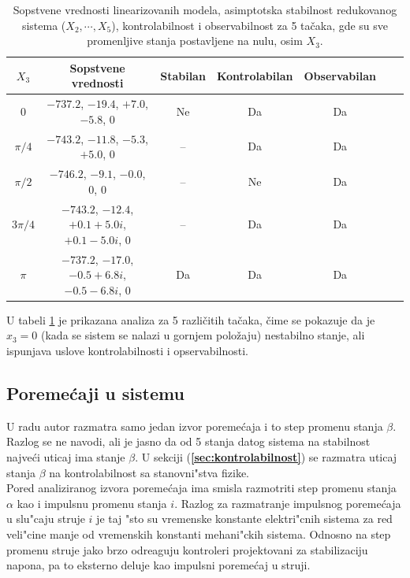 \documentclass[a4paper,11pt]{article}
\theoremstyle{definition} \newtheorem{deff}{Definicija}[section]
\theoremstyle{definition} \newtheorem{prim}[deff]{Primer}
\theoremstyle{plain} \newtheorem{teor}[deff]{Teorema}
\begin{document}
	
	
	\begin{table}[H]
		\centering
		\caption{Sopstvene vrednosti linearizovanih modela, asimptotska stabilnost redukovanog sistema ($X_2, \cdots, X_5$), kontrolabilnost i observabilnost za 5 tačaka, gde su sve promenljive stanja postavljene na nulu, osim $X_3$.}
		\label{table:eigenvalues}
		\begin{tabular}{c c c c c c c}
			\hline
			$X_3$ & Sopstvene vrednosti & Stabilan & Kontrolabilan & Observabilan \\
			\hline
			0 & $-737.2$, $-19.4$, $+7.0$, $-5.8$, $0$ & Ne & Da & Da \\
			$\pi/4$ & $-743.2$, $-11.8$, $-5.3$, $+5.0$, $0$ & -- & Da & Da \\
			$\pi/2$ & $-746.2$, $-9.1$, $-0.0$, $0$, $0$ & -- & Ne & Da \\
			$3\pi/4$ & $-743.2$, $-12.4$, $+0.1 + 5.0i$, $+0.1 - 5.0i$, $0$ & -- & Da & Da \\
			$\pi$ & $-737.2$, $-17.0$, $-0.5 + 6.8i$, $-0.5 - 6.8i$, $0$ & Da & Da & Da \\
			\hline
		\end{tabular}
		\label{tab:5_tacaka}
	\end{table}
	
	U tabeli \ref{tab:5_tacaka} je prikazana analiza za 5 različitih tačaka, čime se pokazuje da je $x_3 = 0$ (kada se sistem se nalazi u gornjem položaju) nestabilno stanje, ali ispunjava uslove kontrolabilnosti i opservabilnosti. 
	\\[16pt]
	
	\subsection{Poremećaji u sistemu}
	
	 U radu \cite{inicijalna} autor razmatra samo jedan izvor poreme\'caja i to step promenu stanja $\beta$. Razlog se ne navodi, ali je jasno da od 5 stanja datog sistema na stabilnost najve\'ci uticaj ima stanje $\beta$. U sekciji (\textbf{\ref{sec:kontrolabilnost}}) se razmatra uticaj stanja $\beta$ na kontrolabilnost sa stanovni"stva fizike. \\
	 
	 Pored analiziranog izvora poreme\'caja ima smisla razmotriti step promenu stanja $\alpha$ kao i impulsnu promenu stanja $i$. Razlog za razmatranje impulsnog poreme\'caja u slu"caju struje $i$ je taj "sto su vremenske konstante elektri"cnih sistema za red veli"cine manje od vremenskih konstanti mehani"ckih sistema. Odnosno na step promenu struje jako brzo odreaguju kontroleri projektovani za stabilizaciju napona, pa to eksterno deluje kao impulsni poreme\'caj u struji. \\
	 
\end{document}
